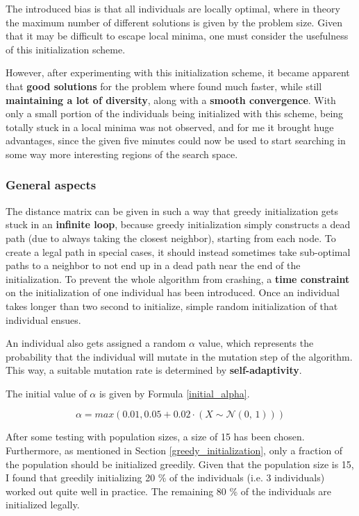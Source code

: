 \documentclass[a4paper,10pt]{article}
\begin{document}
The introduced bias is that all individuals are locally optimal, where in theory the maximum number of different solutions is given by the problem size. Given that it may be difficult to escape local minima, one must consider the usefulness of this initialization scheme.

However, after experimenting with this initialization scheme, it became apparent that \textbf{good solutions} for the problem where found much faster, while still \textbf{maintaining a lot of diversity}, along with a \textbf{smooth convergence}. With only a small portion of the individuals being initialized with this scheme, being totally stuck in a local minima was not observed, and for me it brought huge advantages, since the given five minutes could now be used to start searching in some way more interesting regions of the search space.

\subsubsection{General aspects}
\label{general_aspects_initialization}
The distance matrix can be given in such a way that greedy initialization gets stuck in an \textbf{infinite loop}, because greedy initialization simply constructs a dead path (due to always taking the closest neighbor), starting from each node. To create a legal path in special cases, it should instead sometimes take sub-optimal paths to a neighbor to not end up in a dead path near the end of the initialization. To prevent the whole algorithm from crashing, a \textbf{time constraint} on the initialization of one individual has been introduced. Once an individual takes longer than two second to initialize, simple random initialization of that individual ensues.

An individual also gets assigned a random $\alpha$ value, which represents the probability that the individual will mutate in the mutation step of the algorithm. This way, a suitable mutation rate is determined by \textbf{self-adaptivity}.

The initial value of $\alpha$ is given by Formula \ref{initial_alpha}.

\begin{equation}
    \label{initial_alpha}
    \alpha = max(0.01, 0.05+0.02 \cdot (X \sim \mathcal{N}(0,\,1)))
\end{equation}

After some testing with population sizes, a size of 15 has been chosen. Furthermore, as mentioned in Section \ref{greedy_initialization}, only a fraction of the population should be initialized greedily. Given that the  population size is 15, I found that greedily initializing 20 \% of the individuals (i.e. 3 individuals) worked out quite well in practice. The remaining 80 \% of the individuals are initialized legally.
\end{document}
